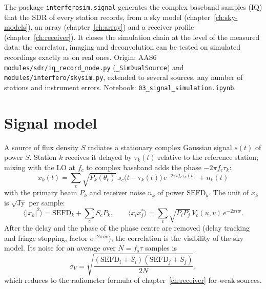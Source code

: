 \label{ch:signal}

The package \texttt{interferosim.signal} generates the complex baseband
samples (IQ) that the SDR of every station records, from a sky model
(chapter~\ref{ch:sky-models}), an array (chapter~\ref{ch:array}) and a
receiver profile (chapter~\ref{ch:receiver}). It closes the simulation
chain at the level of the measured data: the correlator, imaging and
deconvolution can be tested on simulated recordings exactly as on real
ones. Origin: AAS6 \texttt{modules/sdr/iq\_record\_node.py}
(\texttt{\_SimDualSource}) and \texttt{modules/interfero/skysim.py},
extended to several sources, any number of stations and instrument errors.
Notebook: \texttt{03\_signal\_simulation.ipynb}.

\section{Signal model}

A source of flux density $S$ radiates a stationary complex Gaussian signal
$s(t)$ of power $S$. Station $k$ receives it delayed by $\tau_k(t)$ relative
to the reference station; mixing with the LO at $f_c$ to complex baseband
adds the phase $-2\pi f_c\tau_k$:
\begin{equation}
  x_k(t) = \sum_c \sqrt{P_k(\theta_c)}\; s_c\bigl(t-\tau_k(t)\bigr)\,
           e^{-2\pi i f_c\tau_k(t)} + n_k(t)
  \label{eq:iq-model}
\end{equation}
with the primary beam $P_k$ and receiver noise $n_k$ of power
$\mathrm{SEFD}_k$. The unit of $x_k$ is $\sqrt{\mathrm{Jy}}$ per sample:
\begin{equation}
  \langle|x_k|^2\rangle = \mathrm{SEFD}_k + \sum_c S_c P_k,\qquad
  \langle x_i x_j^*\rangle = \sum_c \sqrt{P_iP_j}\,V_c(u,v)\,e^{-2\pi i w}.
\end{equation}
After the delay and the phase of the phase centre are removed (delay
tracking and fringe stopping, factor $e^{+2\pi i w}$), the correlation
is the visibility of the sky model. Its noise for an average over
$N = f_s\tau$ samples is
\begin{equation}
  \sigma_V = \sqrt{\frac{(\mathrm{SEFD}_i+S_i)(\mathrm{SEFD}_j+S_j)}{2N}},
\end{equation}
which reduces to the radiometer formula of chapter~\ref{ch:receiver} for
weak sources.

